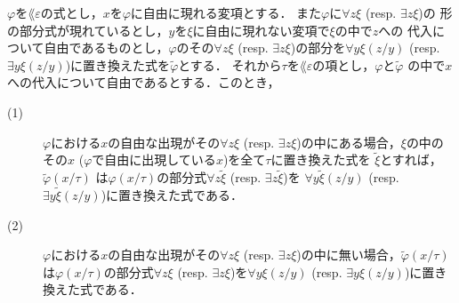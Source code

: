 	\begin{screen}
		\begin{metathm}[部分式の取り替えと代入]
		\label{metathm:subformula_replacing_and_substitution}
			$\varphi$を$\lang{\varepsilon}$の式とし，$x$を$\varphi$に自由に現れる変項とする．
			また$\varphi$に$\forall z \xi$ (resp. $\exists z \xi$)の
			形の部分式が現れているとし，$y$を$\xi$に自由に現れない変項で$\xi$の中で$z$への
			代入について自由であるものとし，$\varphi$のその$\forall z \xi$ 
			(resp. $\exists z \xi$)の部分を$\forall y \xi(z/y)$ 
			(resp. $\exists y \xi(z/y)$)に置き換えた式を$\widetilde{\varphi}$とする．
			それから$\tau$を$\lang{\varepsilon}$の項とし，$\varphi$と$\widetilde{\varphi}$
			の中で$x$への代入について自由であるとする．このとき，
			\begin{description}
				\item[(1)] $\varphi$における$x$の自由な出現がその$\forall z \xi$ 
					(resp. $\exists z \xi$)の中にある場合，$\xi$の中のその$x$
					($\varphi$で自由に出現している$x$)を全て$\tau$に置き換えた式を
					$\widetilde{\xi}$とすれば，$\widetilde{\varphi}(x/\tau)$
					は$\varphi(x/\tau)$の部分式$\forall z \widetilde{\xi}$ 
					(resp. $\exists z \widetilde{\xi}$)を
					$\forall y \widetilde{\xi}(z/y)$ 
					(resp. $\exists y \widetilde{\xi}(z/y)$)に置き換えた式である．
					
				\item[(2)] $\varphi$における$x$の自由な出現がその$\forall z \xi$ 
					(resp. $\exists z \xi$)の中に無い場合，$\widetilde{\varphi}(x/\tau)$
					は$\varphi(x/\tau)$の部分式$\forall z \xi$ 
					(resp. $\exists z \xi$)を$\forall y \xi(z/y)$ 
					(resp. $\exists y \xi(z/y)$)に置き換えた式である．
			\end{description}
		\end{metathm}
	\end{screen}
	
